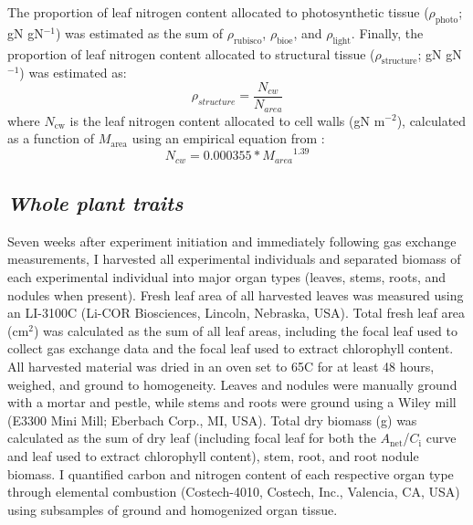 The proportion of leaf nitrogen content allocated to photosynthetic tissue ($\rho_\mathrm{photo}$; gN gN$^{-1}$) was estimated as the sum of $\rho_\mathrm{rubisco}$, $\rho_\mathrm{bioe}$, and $\rho_\mathrm{light}$. Finally, the proportion of leaf nitrogen content allocated to structural tissue ($\rho_\mathrm{structure}$; gN gN$^{-1}$) was estimated as:
\begin{equation} \label{eqn_5.9}
    \rho_{structure}=\frac{N_{cw}}{N_{area}}
\end{equation}
\noindent where $N_\mathrm{cw}$ is the leaf nitrogen content allocated to cell walls (gN m$^{-2}$), calculated as a function of $M_\mathrm{area}$ using an empirical equation from :
\begin{equation} \label{eqn_5.10}
    N_{cw}=0.000355*{M_{area}}^{1.39}
\end{equation}

\subsection{\textit{Whole plant traits}}
\noindent Seven weeks after experiment initiation and immediately following gas exchange measurements, I harvested all experimental individuals and separated biomass of each experimental individual into major organ types (leaves, stems, roots, and nodules when present). Fresh leaf area of all harvested leaves was measured using an LI-3100C (Li-COR Biosciences, Lincoln, Nebraska, USA). Total fresh leaf area (cm$^2$) was calculated as the sum of all leaf areas, including the focal leaf used to collect gas exchange data and the focal leaf used to extract chlorophyll content. All harvested material was dried in an oven set to 65\textdegree{}C for at least 48 hours, weighed, and ground to homogeneity. Leaves and nodules were manually ground with a mortar and pestle, while stems and roots were ground using a Wiley mill (E3300 Mini Mill; Eberbach Corp., MI, USA). Total dry biomass (g) was calculated as the sum of dry leaf (including focal leaf for both the $A_\mathrm{net}$/$C_\mathrm{i}$ curve and leaf used to extract chlorophyll content), stem, root, and root nodule biomass. I quantified carbon and nitrogen content of each respective organ type through elemental combustion (Costech-4010, Costech, Inc., Valencia, CA, USA) using subsamples of ground and homogenized organ tissue. 

